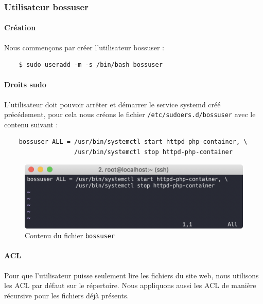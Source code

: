 \documentclass{extarticle} %
\begin{document}
    \subsubsection{Utilisateur bossuser}

    \paragraph{Création} Nous commençons par créer l'utilisateur bossuser :

    \begin{verbatim}
    $ sudo useradd -m -s /bin/bash bossuser
    \end{verbatim}

    \paragraph{Droits sudo} L’utilisateur doit pouvoir arrêter et démarrer le service systemd créé précédement,
    pour cela nous créons le fichier \texttt{/etc/sudoers.d/bossuser} avec le contenu suivant :

    \begin{verbatim}
    bossuser ALL = /usr/bin/systemctl start httpd-php-container, \
                   /usr/bin/systemctl stop httpd-php-container
    \end{verbatim}

    \begin{figure}[H]
      \centering
      \includegraphics[scale=0.7]{img/bossuser.png}
      \caption{Contenu du fichier \texttt{bossuser}}
    \end{figure}

    \paragraph{ACL} Pour que l’utilisateur puisse seulement lire les fichiers du site web, nous utilisons les
    ACL par défaut sur le répertoire. Nous appliquons aussi les ACL de manière récursive pour les fichiers déjà présents.
\end{document}
